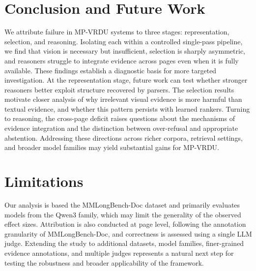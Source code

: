 \documentclass[11pt]{article}
\begin{document}


\section{Conclusion and Future Work}

We attribute failure in MP-VRDU systems to three stages: representation, selection, and reasoning. Isolating each within a controlled single-pass pipeline, we find that vision is necessary but insufficient, selection is sharply asymmetric, and reasoners struggle to integrate evidence across pages even when it is fully available. These findings establish a diagnostic basis for more targeted investigation. At the representation stage, future work can test whether stronger reasoners better exploit structure recovered by parsers. The selection results motivate closer analysis of why irrelevant visual evidence is more harmful than textual evidence, and whether this pattern persists with learned rankers. Turning to reasoning, the cross-page deficit raises questions about the mechanisms of evidence integration and the distinction between over-refusal and appropriate abstention. Addressing these directions across richer corpora, retrieval settings, and broader model families may yield substantial gains for MP-VRDU.



\section*{Limitations}
Our analysis is based the MMLongBench-Doc dataset and primarily evaluates models from the Qwen3 family, which may limit the generality of the observed effect sizes. Attribution is also conducted at page level, following the annotation granularity of MMLongBench-Doc, and correctness is assessed using a single LLM judge. Extending the study to additional datasets, model families, finer-grained evidence annotations, and multiple judges represents a natural next step for testing the robustness and broader applicability of the framework.


%


\appendix






\end{document}
